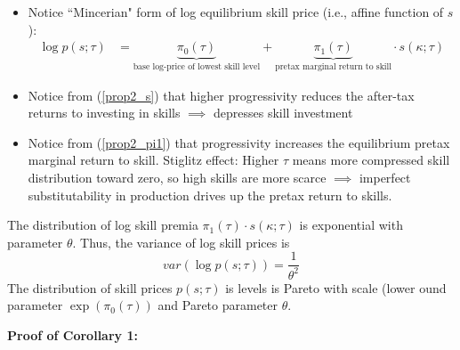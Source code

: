 \documentclass{article}
\begin{document}
\begin{itemize}
\item Notice ``Mincerian" form of log equilibrium skill price (i.e., affine function of $s$): 
\begin{align*}
\log p(s; \tau) &= \underbrace{\pi_0(\tau)}_{\text{base log-price of lowest skill level}} + \underbrace{\pi_1(\tau)}_{\text{pretax marginal return to skill}} \cdot s(\kappa; \tau)
\end{align*}
\item Notice from (\ref{prop2_s}) that higher progressivity reduces the after-tax returns to investing in skills $\implies$ depresses skill investment
\item Notice from (\ref{prop2_pi1}) that progressivity increases the equilibrium pretax marginal return to skill. Stiglitz effect: Higher $\tau$ means more compressed skill distribution toward zero, so high skills are more scarce $\implies$ imperfect substitutability in production drives up the pretax return to skills.
\end{itemize}

{
\corollary The distribution of log skill premia $\pi_1(\tau) \cdot s(\kappa;\tau)$ is exponential with parameter $\theta$. Thus, the variance of log skill prices is 
$$
var(\log p(s;\tau)) = \frac{1}{\theta^2}
$$
The distribution of skill prices $p(s; \tau)$ is levels is Pareto with scale (lower ound parameter $\exp(\pi_0(\tau))$ and Pareto parameter $\theta$.
}

\pagebreak

\textbf{Proof of Corollary 1:}
\end{document}

